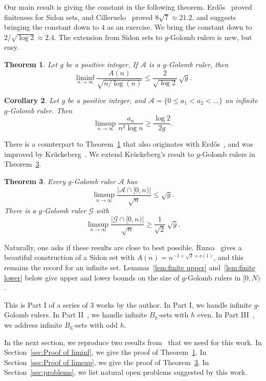 \documentclass[10pt]{article}
\newcommand{\cA}{\mathcal{A}}
\newcommand{\cG}{\mathcal{G}}
\newtheorem{thm}{Theorem}
\newtheorem{cor}[thm]{Corollary}
\begin{document}
Our main result is giving the constant in the following theorem. Erd\H{o}s~\cite{1955.Stohr} proved finiteness for Sidon sets, and Cilleruelo~\cite{2015.Cilleruelo-a} proved $8\sqrt{7} \approx 21.2$, and suggests bringing the constant down to $4$ as an exercise. We bring the constant down to $2/\sqrt{\log2} \approx 2.4$. The extension from Sidon sets to $g$-Golomb rulers is new, but easy.
\begin{thm}\label{thm:liminf}
    Let $g$ be a positive integer. 
    If $\cA$ is a $g$-Golomb ruler, then
    \[\liminf_{n\to \infty} \frac{A(n)}{\sqrt{n/\log(n)}} \le \frac{2}{\sqrt{\log 2}} \,\sqrt g .\]
\end{thm} 
\begin{cor}
  Let $g$ be a positive integer, and $\cA=\{0\le a_1<a_2<\dots\}$ an infinite $g$-Golomb ruler. Then
    \[\limsup_{n\to \infty} \frac{a_n}{n^2\log n} \ge \frac{\log 2}{2g}.
    \]
\end{cor}
There is a counterpart to Theorem~\ref{thm:liminf} that also originates with Erd\H{o}s~\cite{1955.Stohr}, and was improved by Kr\"uckeberg~\cite{1961.Kruckeberg}. We extend Kr\"uckeberg's result to $g$-Golomb rulers in Theorem~\ref{thm:limsup}.
\begin{thm}\label{thm:limsup}
    Every $g$-Golomb ruler $\cA$ has
    \[\limsup_{n\to\infty} \frac{|\cA \cap [0,n)|}{\sqrt{n}} \le \sqrt{g } .\]
    There is a $g$-Golomb ruler $\cG$ with 
    \[\limsup_{n\to\infty} \frac{|\cG \cap [0,n)|}{\sqrt{n}} \ge \frac{1}{\sqrt2}\,\sqrt g .\]
\end{thm}    

Naturally, one asks if these results are close to best possible. Ruzsa~\cite{1998.Ruzsa-a} gives a beautiful construction of a Sidon set with $A(n) = n^{-1+\sqrt2+o(1)}$, and this remains the record for an infinite set. Lemmas~\ref{lem:finite upper} and~\ref{lem:finite lower} below give upper and lower bounds on the size of $g$-Golomb rulers in $[0,N)$.

This is Part I of a series of 3 works by the author. In Part I, we handle infinite $g$-Golomb rulers. In Part II~\cite{2026.Obryant-b}, we handle infinite $B_h$-sets with $h$ even. In Part III~\cite{2026.Obryant-c}, we address infinite $B_h$-sets with odd $h$.

In the next section, we reproduce two results from~\cite{2015.Caicedo&Martos&Trujillo} that we need for this work. In Section~\ref{sec:Proof of liminf}, we give the proof of Theorem~\ref{thm:liminf}. In Section~\ref{sec:Proof of limsup}, we give the proof of Theorem~\ref{thm:limsup}. In Section~\ref{sec:problems}, we list natural open problems suggested by this work.
\end{document}

